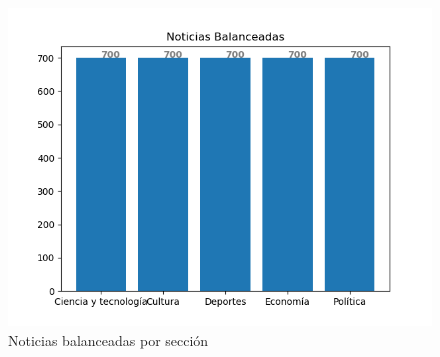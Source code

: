 \begin{figure}[H]
	\centering
	\includegraphics[scale=.70]{imagenes/Capitulo5/noticiasBalanceadas.png}
	\caption{Noticias balanceadas por sección}
	\label{fig:notBalanceadas}
\end{figure}
